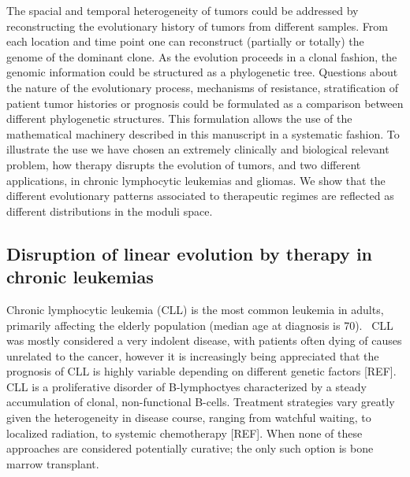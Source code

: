 \documentclass[a4paper,11pt]{article}
\begin{document}
The spacial and temporal heterogeneity of tumors could be addressed by reconstructing the evolutionary history of tumors from different samples. From each location and time point one can reconstruct (partially or totally) the genome of the dominant clone. As the evolution proceeds in a clonal fashion, the genomic information could be structured as a phylogenetic tree. Questions about the nature of the evolutionary process, mechanisms of resistance, stratification of patient tumor histories or prognosis could be formulated as a comparison between different phylogenetic structures. This formulation allows the use of the mathematical machinery described in this manuscript in a systematic fashion. To illustrate the use we have chosen an extremely clinically and biological relevant problem, how therapy disrupts the evolution of tumors, and two different applications, in chronic lymphocytic leukemias and gliomas. We show that the different evolutionary patterns associated to therapeutic regimes are reflected as different distributions in the moduli space.

\subsection{Disruption of linear evolution by therapy in chronic leukemias}

Chronic lymphocytic leukemia (CLL) is the most common leukemia in adults, primarily affecting the elderly population (median age at diagnosis is 70).~\cite{smith2011incidence}
CLL was mostly considered a very indolent disease, with patients often dying of causes unrelated to the cancer, however it is increasingly being appreciated that the prognosis of CLL is highly variable depending on different genetic factors [REF].
CLL is a proliferative disorder of B-lymphoctyes characterized by a steady accumulation of clonal, non-functional B-cells.
Treatment strategies vary greatly given the heterogeneity in disease course, ranging from watchful waiting, to localized radiation, to systemic chemotherapy [REF].
When none of these approaches are considered potentially curative; the only such option is bone marrow transplant.
\end{document}
